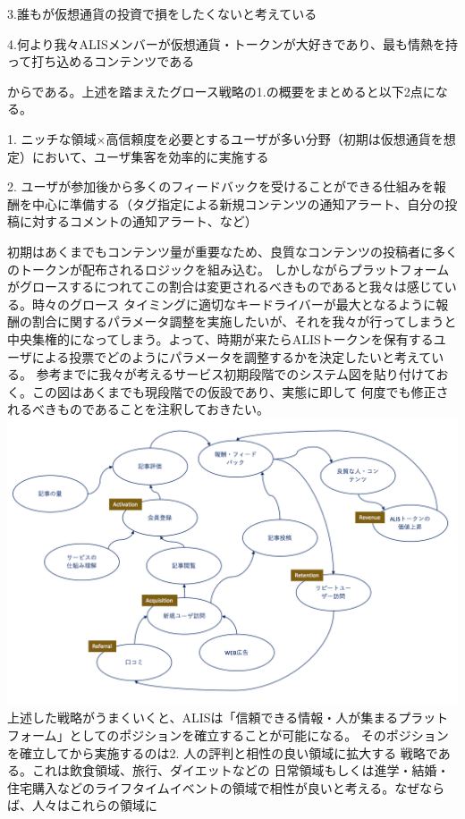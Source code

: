 \documentclass{jsarticle}
\begin{document}
3.誰もが仮想通貨の投資で損をしたくないと考えている

4.何より我々ALISメンバーが仮想通貨・トークンが大好きであり、最も情熱を持って打ち込めるコンテンツである

からである。上述を踏まえたグロース戦略の1.の概要をまとめると以下2点になる。

1. ニッチな領域×高信頼度を必要とするユーザが多い分野（初期は仮想通貨を想定）において、ユーザ集客を効率的に実施する

2. ユーザが参加後から多くのフィードバックを受けることができる仕組みを報酬を中心に準備する（タグ指定による新規コンテンツの通知アラート、自分の投稿に対するコメントの通知アラート、など）

初期はあくまでもコンテンツ量が重要なため、良質なコンテンツの投稿者に多くのトークンが配布されるロジックを組み込む。
しかしながらプラットフォームがグロースするにつれてこの割合は変更されるべきものであると我々は感じている。時々のグロース
タイミングに適切なキードライバーが最大となるように報酬の割合に関するパラメータ調整を実施したいが、それを我々が行ってしまうと
中央集権的になってしまう。よって、時期が来たらALISトークンを保有するユーザによる投票でどのようにパラメータを調整するかを決定したいと考えている。
参考までに我々が考えるサービス初期段階でのシステム図を貼り付けておく。この図はあくまでも現段階での仮設であり、実態に即して
何度でも修正されるべきものであることを注釈しておきたい。
	\includegraphics[scale=0.6]{img/systemthinking-with-AARRR.png}
上述した戦略がうまくいくと、ALISは「信頼できる情報・人が集まるプラットフォーム」としてのポジションを確立することが可能になる。
そのポジションを確立してから実施するのは2. 人の評判と相性の良い領域に拡大する 戦略である。これは飲食領域、旅行、ダイエットなどの
日常領域もしくは進学・結婚・住宅購入などのライフタイムイベントの領域で相性が良いと考える。なぜならば、人々はこれらの領域に
\end{document}
